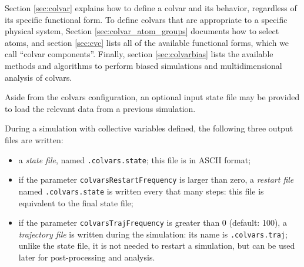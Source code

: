 
Section \ref{sec:colvar} explains how to define a colvar and its behavior, regardless of its specific functional form.
To define colvars that are appropriate to a specific physical system, Section \ref{sec:colvar_atom_groups} documents how to select atoms, and section \ref{sec:cvc} lists all of the available functional forms, which we call ``colvar components''.
Finally, section \ref{sec:colvarbias} lists the available methods and algorithms to perform biased simulations and multidimensional analysis of colvars.


\label{sec:colvars_input}

Aside from the colvars configuration, an optional input state file may be provided to load the relevant data from a previous simulation.



\label{sec:colvars_output}

During a simulation with collective variables defined, the following three output files are written:

\begin{itemize}

\item a \emph{state file}, named \outputName\texttt{.colvars.state}; this file is in ASCII format;

\item if  the parameter \texttt{colvarsRestartFrequency} is larger than zero, a \emph{restart file} named \restartName\texttt{.colvars.state} is written every that many steps: this file is equivalent to the final state file;

\item if the parameter \texttt{colvarsTrajFrequency} is greater than 0 (default: 100), a \emph{trajectory file} is written during the simulation: its name is \outputName\texttt{.colvars.traj}; unlike the state file, it is not needed to restart a simulation, but can be used later for post-processing and analysis.

\end{itemize}

